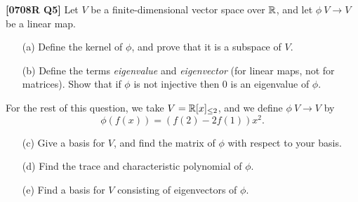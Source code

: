 \documentclass[a4paper]{article}
\begin{document}
\begin{problem}\textbf{[0708R Q5]}
 Let $V$ be a finite-dimensional vector space over ${\mathbb{R}}$, and let
 $\phi\:V\to V$ be a linear map.
 \begin{itemize}
  \item[(a)] Define the kernel of $\phi$, and prove that it is a
   subspace of $V$.  
  \item[(b)] Define the terms \emph{eigenvalue} and
   \emph{eigenvector} (for linear maps, not for matrices).  Show that
   if $\phi$ is not injective then $0$ is an eigenvalue of $\phi$.  
 \end{itemize}
 For the rest of this question, we take $V={\mathbb{R}}[x]_{\leq 2}$, and we
 define $\phi\:V\to V$ by 
 \[ \phi(f(x))=(f(2)-2f(1))x^2. \]
 \begin{itemize}
  \item[(c)] Give a basis for $V$, and find the matrix of $\phi$ with
   respect to your basis.  
  \item[(d)] Find the trace and characteristic polynomial of $\phi$.  
  \item[(e)] Find a basis for $V$ consisting of eigenvectors of
   $\phi$. 
 \end{itemize}
\end{problem}
\end{document}
